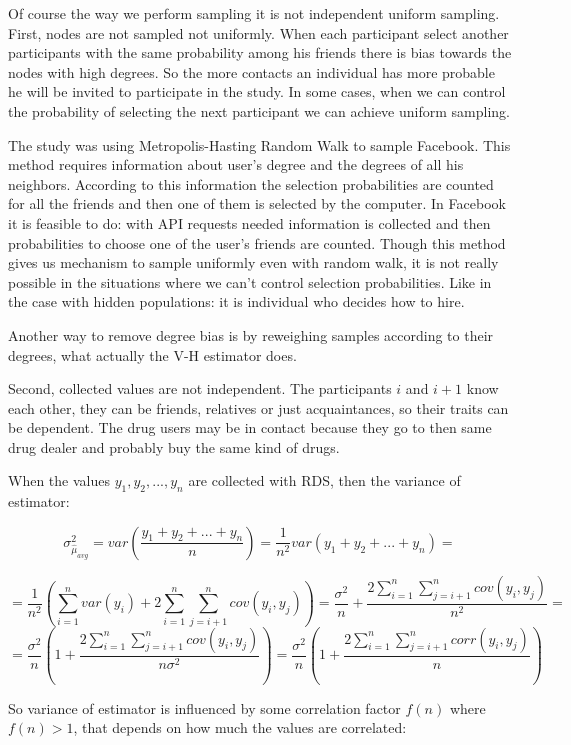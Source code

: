 \documentclass[12pt]{report}
\begin{document}
Of course the way we perform sampling it is not independent uniform sampling. 
First, nodes are not sampled not uniformly. When each participant select another  participants with the same probability among his friends there is bias towards the nodes with high degrees. So the more contacts an individual has more probable he will be invited to participate in the study. In some cases, when we can control the probability of selecting the next participant we can achieve uniform sampling.

The study \cite{gjoka2009walk} was using Metropolis-Hasting Random Walk to sample Facebook. This method requires information about user's degree and the degrees of all his neighbors. According to this information the selection probabilities are counted for all the friends and then one of them is selected by the computer.
In Facebook it is feasible to do: with API requests needed information is collected and then probabilities to choose one of the user's friends are counted. Though this method gives us mechanism to sample uniformly even with random walk, it is not really possible in the situations where we can't control selection probabilities. Like in the case with hidden populations: it is individual who decides how to hire. 

Another way to remove degree bias is by reweighing samples according to their degrees, what actually the V-H estimator does. 

Second, collected values are not independent. The participants $i$ and $i+1$ know each other, they can be friends, relatives or just acquaintances, so their traits can be dependent. The drug users may be in contact because they go to then same drug dealer and probably buy the same kind of drugs. 


When the values $y_1, y_2, ..., y_n$ are collected with RDS, then the variance of estimator:

$$ \sigma^2_{\hat{\mu}_{avg}} = var\left( \frac{y_1 + y_2 + ... + y_n}{n}\right)=\frac{1}{n^2} var(y_1 + y_2 + ... + y_n) =$$

$$= \frac{1}{n^2} \left(\sum_{i = 1}^n var(y_i) + 2\sum_{i=1}^n \sum_{j=i+1}^n cov(y_i, y_j)\right)= \frac{\sigma^2}{n} + \frac{2\sum_{i=1}^n \sum_{j=i+1}^n cov(y_i, y_j)}{n^2} = $$
$$ = \frac{\sigma^2}{n} \left(1 + \frac{2\sum_{i=1}^n \sum_{j=i+1}^n cov(y_i, y_j)}{n\sigma^2}\right) = \frac{\sigma^2}{n} \left(1 + \frac{2\sum_{i=1}^n \sum_{j=i+1}^n corr(y_i, y_j)}{n}\right)$$

So variance of estimator is influenced by some correlation factor $f(n)$ where$f(n) > 1$, that depends on how much the values are correlated:
\end{document}
